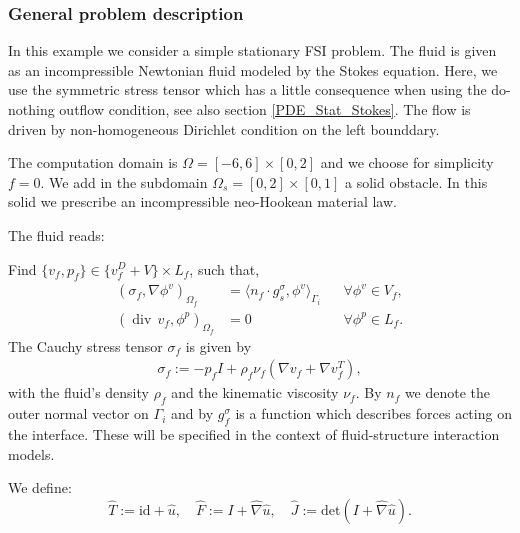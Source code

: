 \subsubsection{General problem description}
   
In this example we consider a simple stationary FSI problem. The fluid
is given as an incompressible Newtonian fluid modeled by the Stokes
equation. Here, we use the symmetric stress tensor which has a little
consequence when using the do-nothing outflow condition, see also
section \ref{PDE_Stat_Stokes}. The flow is driven by non-homogeneous Dirichlet 
condition on the left bounddary.

The computation domain is $\Omega = [-6,6]\times [0,2]$ and we choose for
simplicity $f=0$. 
We add in the subdomain $\Omega_s = [0,2]\times [0,1]$ a solid obstacle. In
this 
solid we prescribe an incompressible neo-Hookean material law.



The fluid reads: 
\begin{Problem}
 Find $\{v_f,p_f\} \in \{ v_f^D + V\} \times L_f$, such that,
  \begin{equation*}
    \begin{aligned} 
      (\sigma_f,\nabla\phi^v)_{\Omega_f} 
      &= \langle n_f\cdot g_s^\sigma ,\phi^v \rangle_{\Gamma_i}
      &&\forall \phi^v\in V_f, \\
      (\operatorname{div}\, v_f,\phi^p)_{\Omega_f} &= 0
      &&\forall\phi^p\in L_f.
    \end{aligned}
  \end{equation*}
  The Cauchy stress tensor $\sigma_f$ is given by 
  \begin{eqnarray}
    \sigma_f:=-p_f I + \rho_f\nu_f (\nabla v_f+\nabla v_f^T),
  \end{eqnarray}
  with the fluid's density $\rho_f$  and the kinematic viscosity
  $\nu_f$. By $n_f$ we denote the outer normal vector on $\Gamma_i$
  and by $g^\sigma_f$ is a function which describes forces acting on the interface. These
  will be specified in the context of fluid-structure interaction
  models.  
\end{Problem}
We define:
\begin{equation*}
\hat T:=\text{id}+\hat u,\quad
\hat F:=I+\hat\nabla \hat u,\quad
\hat J:=\text{det}(I+\hat\nabla \hat u).
\end{equation*}


